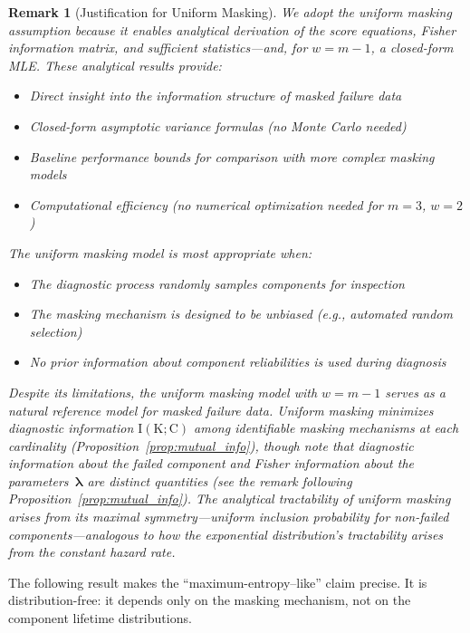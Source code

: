 \documentclass[pdflatex,sn-mathphys-num,Numbered]{sn-jnl}
\newcommand{\RV}[1]{\mathrm{#1}}
\newcommand{\cand}{\RV{C}}         %
\renewcommand{\vec}[1]{\boldsymbol{#1}}
\theoremstyle{thmstyleone}
\theoremstyle{thmstylethree}
\theoremstyle{thmstyletwo}
\newtheorem{remark}[theorem]{Remark}
\begin{document}
\begin{remark}[Justification for Uniform Masking]
We adopt the uniform masking assumption because it enables \emph{analytical derivation} of the score equations, Fisher information matrix, and sufficient statistics---and, for $w = m-1$, a closed-form MLE. These analytical results provide:
\begin{itemize}
\item Direct insight into the information structure of masked failure data
\item Closed-form asymptotic variance formulas (no Monte Carlo needed)
\item Baseline performance bounds for comparison with more complex masking models
\item Computational efficiency (no numerical optimization needed for $m=3$, $w=2$)
\end{itemize}

The uniform masking model is most appropriate when:
\begin{itemize}
\item The diagnostic process randomly samples components for inspection
\item The masking mechanism is designed to be unbiased (e.g., automated random selection)
\item No prior information about component reliabilities is used during diagnosis
\end{itemize}

Despite its limitations, the uniform masking model with $w = m-1$ serves as a natural \emph{reference model} for masked failure data. Uniform masking minimizes diagnostic information $\RV{I}(\RV{K}; \cand)$ among identifiable masking mechanisms at each cardinality (Proposition~\ref{prop:mutual_info}), though note that diagnostic information about the failed component and Fisher information about the parameters~$\vec{\lambda}$ are distinct quantities (see the remark following Proposition~\ref{prop:mutual_info}). The analytical tractability of uniform masking arises from its maximal symmetry---uniform inclusion probability for non-failed components---analogous to how the exponential distribution's tractability arises from the constant hazard rate.
\end{remark}

The following result makes the ``maximum-entropy--like'' claim precise. It is distribution-free: it depends only on the masking mechanism, not on the component lifetime distributions.
\end{document}
